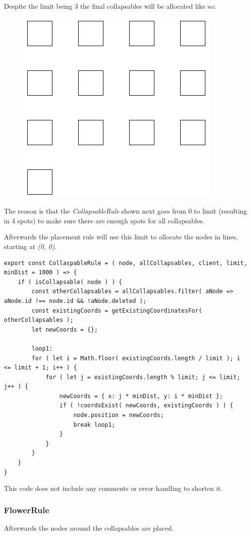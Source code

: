 Despite the limit being 3 the final collapsables will be allocated like so:
\begin{figure}[H]
\centering
\includegraphics[scale=.4]{Bilder/AllocRes.png}
\end{figure}

The reason is that the \emph{CollapsableRule} shown next goes from 0 to limit (resulting in 4 spots) to make sure there are enough spots for all collapsables.

Afterwards the placement rule will use this limit to allocate the nodes in lines, starting at \emph{(0, 0)}.
\begin{lstlisting}[caption={Placing all Collapsables}]
export const CollaspableRule = ( node, allCollapsables, client, limit, minDist = 1000 ) => {
	if ( isCollapsable( node ) ) {
		const otherCollapsables = allCollapsables.filter( aNode => aNode.id !== node.id && !aNode.deleted );
		const existingCoords = getExistingCoordinatesFor( otherCollapsables );
		let newCoords = {};

		loop1:
		for ( let i = Math.floor( existingCoords.length / limit ); i <= limit + 1; i++ ) {
			for ( let j = existingCoords.length % limit; j <= limit; j++ ) {
				newCoords = { x: j * minDist, y: i * minDist };
				if ( !coordsExist( newCoords, existingCoords ) ) {
					node.position = newCoords;
					break loop1;
				}
			}
		} 
	}
}
\end{lstlisting}
This code does not include any comments or error handling to shorten it.

\newpage
\subsubsection{FlowerRule}
Afterwards the nodes around the collapsables are placed. 

